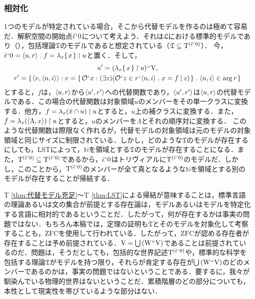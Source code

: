 \subsubsection{相対化}
\label{sssec:相対化}

1つのモデルが特定されている場合，そこから代替モデルを作るのは極めて容易だ．解釈空間の開始点$\breve{\epsilon}{\mspace{1mu}{`}\mspace{1mu}} 0 $について考えよう．それは$\mathfrak{L}$における標準的モデルであり（），包括理論$\mathfrak{T}$のモデルであると想定されている（$ \mathfrak{T}\subseteq \mathrm{T}^{(\breve{\epsilon}{\mspace{1mu}{`}\mspace{1mu}} 0)} $）．
今，$\breve{\epsilon}\fap 0 = \orp{u,r}\con{1}f = \lambda_x\classab{x}\uphr u$と置く．そして，
\begin{gather*}
    u' = (\lambda_x\classab{x}\uphr u)\img\univ,\\
    r' = \classab{\orp{v,\orp{n,i}}:
        v = \classab{\mathcal{O}\fap x:
            (\exists z)(
                \mathcal{O}\fap z\in r\fap \orp{n,i}\con{1}x = f\resl z
            )
        }\con{1}\orp{n,i}\in\arg r
    }
\end{gather*}
とすると，$f$は，$\langle u,r \rangle$から$\langle u',r' \rangle$への代替関数であり，$\langle u',r' \rangle$は$\langle u,r \rangle$の代替モデルである．この場合の代替関数は対象領域$ u $のメンバーをその単一クラスに変換する．他方，$ f = \lambda_x(\bar{x}\cap u)\mathbin{\upharpoonright} u $とすると，$u$上の補クラスに変換する．また，$ f = \lambda_x(\langle \Lambda,x \rangle)\mathbin{\upharpoonright} u $とすると，$u$のメンバーを$\Lambda$とそれの順序対に変換する．
このような代替関数は際限なく作れるが，代替モデルの対象領域は元のモデルの対象領域と同じサイズに制限されている．しかし，どのような$\mathfrak{T}$のモデルが存在するにしても，LSTによって，$\mathbb{N}$を領域とする$\mathfrak{T}$のモデルが存在することになる．また，$\mathrm{T}^{(\breve{\epsilon}{\mspace{1mu}{`}\mspace{1mu}} 0)}\subseteq \mathrm{T}^{(\breve{\epsilon}{\mspace{1mu}{`}\mspace{1mu}} 0)}$であるから，$ \breve{\epsilon}{\mspace{1mu}{`}\mspace{1mu}} 0 $はトリヴィアルに$\mathrm{T}^{(\breve{\epsilon}{\mspace{1mu}{`}\mspace{1mu}} 0)}$のモデルだ．しかし，このことから，$\mathrm{T}^{(\breve{\epsilon}{\mspace{1mu}{`}\mspace{1mu}} 0)}$のメンバーが全て真となるような$\mathbb{N}$を領域とする別のモデルが存在することが帰結する．

T \ref{thm:代替モデル充足}〜T \ref{thm:LST}による帰結が意味することは，標準言語の理論あるいは文の集合が前提とする存在論は，モデルあるいはモデルを特定化する言語に相対的であるということだ．したがって，何が存在するかは事実の問題ではない．もちろん本稿では，定理の証明も$\mathfrak{T}$とそのモデルを対象化して考察することも，$\mathrm{ZFC}$を使用して行われている．したがって，$\mathrm{ZFC}$が認める存在者が存在することは予め前提されている．$\mathrm{V} = {\textstyle\bigcup}\mspace{3mu}(\mathrm{W}{\mspace{1mu}{``}\mspace{1mu}}\mathrm{V})$であることは前提されているのだ．問題は，そうだとしても，包括的な世界記述$\mathrm{T}^{(\breve{\epsilon}{\mspace{1mu}{`}\mspace{1mu}} 0)}$や，標準的な科学を包括する理論$\mathfrak{T}$がモデルを持つ限り，それらが肯定する存在が${\textstyle\bigcup}\mspace{3mu}(\mathrm{W}{\mspace{1mu}{``}\mspace{1mu}}\mathrm{V})$のどのメンバーであるのかは，事実の問題ではないということである．要するに，我々が馴染んでいる物理的世界はないということだ．累積階層のどの部分についても，本性として現実性を帯びているような部分はない．

